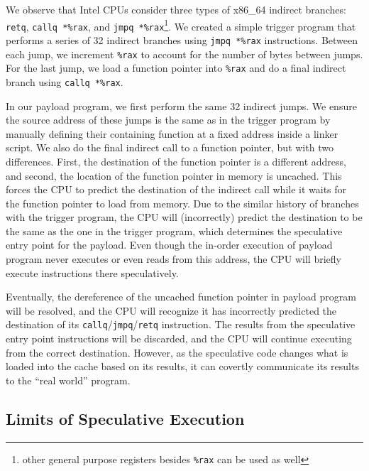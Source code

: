 We observe that Intel CPUs consider three types of x86\_64 indirect branches:
\texttt{retq}, \texttt{callq *\%rax}, and \texttt{jmpq *\%rax}\footnote{other
general purpose registers besides \texttt{\%rax} can be used as well}.
We created a simple trigger program that performs a series of 32 indirect
branches
using \texttt{jmpq *\%rax} instructions. Between each jump, we increment
\texttt{\%rax} to account for the number of bytes between jumps. For the last
jump, we load a function pointer into \texttt{\%rax} and do a final indirect
branch using \texttt{callq *\%rax}.

In our payload program, we first perform the same 32 indirect jumps. We ensure
the source address of these jumps is the same as in the trigger program by
manually defining their containing function at a fixed address inside a linker
script. We also do the final indirect call to a function pointer, but with two
differences. First, the destination of the function pointer is a different
address, and second, the location of the function pointer in memory is uncached.
This forces the CPU to predict the destination of the indirect call while it
waits for the function pointer to load from memory. Due to the similar
history of branches with the trigger program,
the CPU will (incorrectly) predict the destination to be the same as the one in
the trigger program, which determines the speculative entry point for the
payload. Even though the in-order execution of
payload program never executes or even reads from this address, the CPU will
briefly execute instructions there speculatively.

Eventually, the dereference of the uncached function pointer in payload program
will be resolved, and the CPU will recognize it has incorrectly predicted the
destination of its \texttt{callq}/\texttt{jmpq}/\texttt{retq} instruction. The
results from the speculative entry point instructions will be discarded, and the
CPU will continue executing from the correct destination. However, as the
speculative code changes what is loaded into the cache based on its results, it
can covertly communicate its results to the ``real world'' program.



\subsection{Limits of Speculative Execution}

\FigCacheMiss

\FigSpecMeasure

